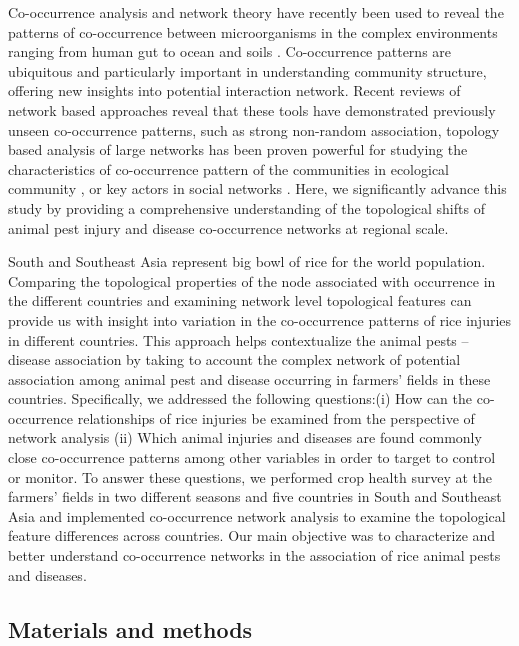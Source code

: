 Co-occurrence analysis and network theory have recently been used to reveal the patterns of co-occurrence between microorganisms in the complex environments ranging from human gut to ocean and soils \citep{Faust_2012_Microbial_co, Ma_2016_Geographic}. Co-occurrence patterns are ubiquitous and particularly important in understanding community structure, offering new insights into potential interaction network. Recent reviews of network based approaches reveal that these tools have demonstrated previously unseen co-occurrence patterns, such as strong non-random association, topology based analysis of large networks has been proven powerful for studying the characteristics of co-occurrence pattern of the communities in ecological community \citep{Williams_2014_demonstrating,Barberan_2012_Network}, or key actors in social networks \citep{Crowston_2006_Hierarchy}. Here, we significantly advance this study by providing a comprehensive understanding of the topological shifts of animal pest injury and disease co-occurrence networks at regional scale.

South and Southeast Asia represent big bowl of rice for the world population. Comparing the topological properties of the node associated with occurrence in the different countries and examining network level topological features can provide us with insight into variation in the co-occurrence patterns of rice injuries in different countries. This approach helps contextualize the animal pests -- disease association by taking to account the complex network of potential association among animal pest and disease occurring in farmers’ fields in these countries. Specifically, we addressed the following questions:(i) How can the co-occurrence relationships of rice injuries be examined from the perspective of network analysis (ii) Which animal injuries and diseases are found commonly close co-occurrence patterns among other variables in order to target to control or monitor. To answer these questions, we performed crop health survey at the farmers’ fields in two different seasons and five countries in South and Southeast Asia and implemented co-occurrence network analysis to examine the topological feature differences  across countries. Our main objective was to characterize and better understand co-occurrence networks in the association of rice animal pests and diseases.

\subsection{Materials and methods} 

